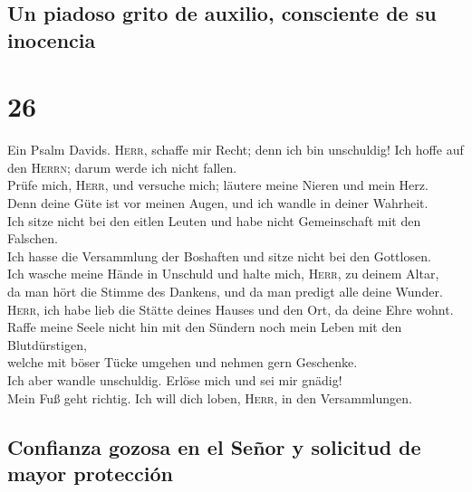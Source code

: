 \hypertarget{un-piadoso-grito-de-auxilio-consciente-de-su-inocencia}{%
\subsection{Un piadoso grito de auxilio, consciente de su
inocencia}\label{un-piadoso-grito-de-auxilio-consciente-de-su-inocencia}}

\hypertarget{section-25}{%
\section{26}\label{section-25}}

 Ein Psalm Davids. \textsc{Herr}, schaffe mir Recht; denn
ich bin unschuldig! Ich hoffe auf den \textsc{Herrn}; darum werde ich
nicht fallen.\\
 Prüfe mich, \textsc{Herr}, und versuche mich; läutere
meine Nieren und mein Herz.\\
 Denn deine Güte ist vor meinen Augen, und ich wandle in
deiner Wahrheit.\\
 Ich sitze nicht bei den eitlen Leuten und habe nicht
Gemeinschaft mit den Falschen.\\
 Ich hasse die Versammlung der Boshaften und sitze nicht
bei den Gottlosen.\\
 Ich wasche meine Hände in Unschuld und halte mich,
\textsc{Herr}, zu deinem Altar,\\
 da man hört die Stimme des Dankens, und da man predigt
alle deine Wunder.\\
 \textsc{Herr}, ich habe lieb die Stätte deines Hauses und
den Ort, da deine Ehre wohnt.\\
 Raffe meine Seele nicht hin mit den Sündern noch mein
Leben mit den Blutdürstigen,\\
 welche mit böser Tücke umgehen und nehmen gern
Geschenke.\\
 Ich aber wandle unschuldig. Erlöse mich und sei mir
gnädig!\\
 Mein Fuß geht richtig. Ich will dich loben,
\textsc{Herr}, in den Versammlungen.

\hypertarget{confianza-gozosa-en-el-seuxf1or-y-solicitud-de-mayor-protecciuxf3n}{%
\subsection{Confianza gozosa en el Señor y solicitud de mayor
protección}\label{confianza-gozosa-en-el-seuxf1or-y-solicitud-de-mayor-protecciuxf3n}}

